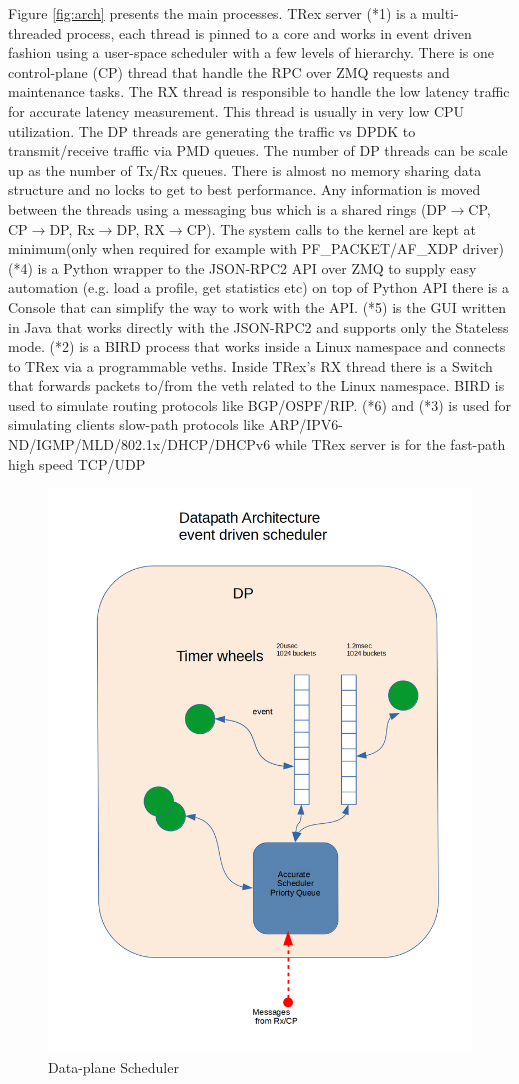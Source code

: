 \documentclass[conference]{IEEEtran}
\begin{document}
Figure \ref{fig:arch} presents the main processes. TRex server (*1) is a multi-threaded process, each thread is pinned to a core and works in 
event driven fashion using a user-space scheduler with a few levels of hierarchy. There is one control-plane (CP) thread that handle the RPC over ZMQ requests and maintenance tasks. 
The RX thread is responsible to handle the low latency traffic for accurate latency measurement. This thread is usually in very low CPU utilization. 
The DP threads are generating the traffic vs DPDK to transmit/receive traffic via PMD queues. 
The number of DP threads can be scale up as the number of Tx/Rx queues. 
There is almost no memory sharing data structure and no locks to get to best performance. 
Any information is moved between the threads using a messaging bus which 
is a shared rings (DP$\rightarrow$CP, CP$\rightarrow$DP, Rx$\rightarrow$DP, RX$\rightarrow$CP).
The system calls to the kernel are kept at minimum(only when required for example with PF\_PACKET/AF\_XDP driver)
(*4) is a Python wrapper to the JSON-RPC2 API over ZMQ to supply easy automation (e.g. load a profile, get statistics etc)
on top of Python API there is a Console that can simplify the way to work with the API. 
(*5) is the GUI written in Java that works directly with the JSON-RPC2 and supports only the Stateless mode.
(*2) is a BIRD \cite{b4} process that works inside a Linux namespace and connects to TRex via a programmable veths. Inside TRex's RX thread there is a Switch that forwards packets to/from the veth related to the Linux namespace. 
BIRD is used to simulate routing protocols like BGP/OSPF/RIP.
(*6) and (*3) is used for simulating clients slow-path protocols like ARP/IPV6-ND/IGMP/MLD/802.1x/DHCP/DHCPv6 while TRex server is for the fast-path high speed TCP/UDP

\begin{figure}[h]
  \includegraphics[width=0.3
  \textwidth, center]{trex_dp_sheduler.png}
  \caption{Data-plane Scheduler}
  \label{fig:dp_schduler}
\end{figure}
  
\end{document}
